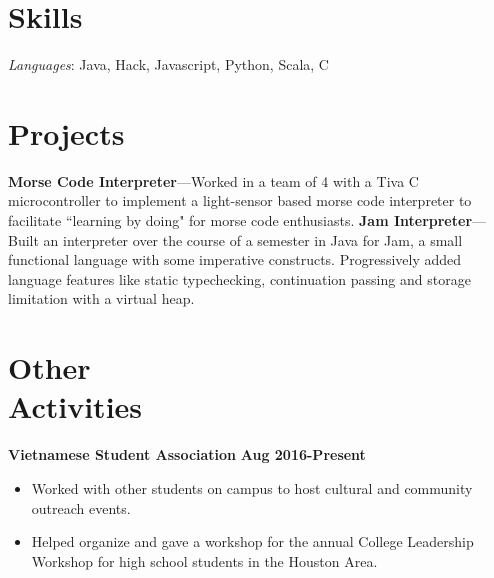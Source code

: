 \documentclass[margin,line]{resume}
\begin{document}
\begin{resume}
\section{\mysidestyle Skills}

\emph{Languages}: Java, Hack, Javascript, Python, Scala, C
\section{\mysidestyle Projects}

\textbf{Morse Code Interpreter}---Worked in a team of 4 with a Tiva C microcontroller to implement a light-sensor based morse code interpreter to facilitate ``learning by doing" for morse code enthusiasts.
\textbf{Jam Interpreter}---Built an interpreter over the course of a semester in Java for Jam, a small functional language with some imperative constructs. 
Progressively added language features like static typechecking, continuation passing and storage limitation with a virtual heap.

\section{\mysidestyle Other\\ Activities}
\textbf{Vietnamese Student Association} \hfill \textbf{Aug 2016-Present}
\begin{itemize}
    \item Worked with other students on campus to host cultural and community outreach events.
    \item Helped organize and gave a workshop for the annual College Leadership Workshop for high school students in the Houston Area.
\end{itemize}



\end{resume}
\end{document}
